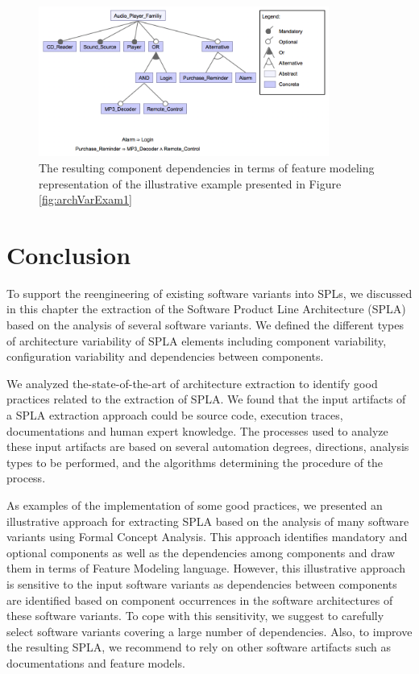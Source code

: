 \documentclass[graybox]{svmult}
\begin{document}
\begin{figure} [h]
\centering
\includegraphics[width=0.85\textwidth]{figs/audio-player-arch-fm.png}
\caption{The resulting component dependencies in terms of feature modeling representation of the illustrative example presented in Figure \ref{fig:archVarExam1}}
\label{fig:audio-arch-feature-model}
\end{figure}



\section{Conclusion}
\label{sec:conclusion}
To support the reengineering of existing software variants into SPLs, 
we discussed in this chapter the extraction of the Software Product Line Architecture (SPLA) based on the analysis of several software variants. We defined the different types of architecture variability of SPLA elements including component variability, configuration variability and dependencies between components. 

We analyzed the-state-of-the-art of architecture extraction to identify good practices related to the extraction of SPLA. We found that the input artifacts of a  SPLA extraction approach could be source code, execution traces, documentations and human expert knowledge. The processes used to analyze these input artifacts are based on several automation degrees, directions, analysis types to be performed, and the algorithms determining the procedure of the process.
 

As examples of the implementation of some good practices, we presented an illustrative approach for extracting SPLA based on the analysis of many software variants using Formal Concept Analysis. This approach identifies mandatory and optional components as well as the dependencies among components and draw them in terms of Feature Modeling language.
However, this illustrative approach is sensitive to the input software variants as dependencies between components are identified based on component occurrences in the software architectures of these software variants. To cope with this sensitivity, we suggest to carefully select software variants covering a large number of dependencies. Also, to improve the resulting SPLA, we recommend to rely on other software artifacts such as documentations and feature models.
\end{document}
